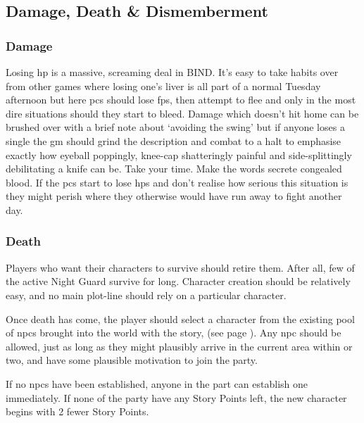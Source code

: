\begin{multicols}{2}

\subsection{Damage, Death \& Dismemberment}

\subsubsection{Damage}

Losing \gls{hp} is a massive, screaming deal in BIND.
It's easy to take habits over from other games where losing one's liver is all part of a normal Tuesday afternoon but here \glspl{pc} should lose \glspl{fp}, then attempt to flee and only in the most dire situations should they start to bleed.
Damage which doesn't hit home can be brushed over with a brief note about `avoiding the swing' but if anyone loses a single  the \gls{gm} should grind the description and combat to a halt to emphasise exactly how eyeball poppingly, knee-cap shatteringly painful and side-splittingly debilitating a knife can be.
Take your time.
Make the words secrete congealed blood.
If the \glspl{pc} start to lose \glspl{hp} and don't realise how serious this situation is they might perish where they otherwise would have run away to fight another day.

\subsubsection{Death}
\label{pcdeath}

Players who want their characters to survive should retire them.
After all, few of the active Night Guard survive for long.
Character creation should be relatively easy, and no main plot-line should rely on a particular character.

Once death has come, the player should select a character from the existing pool of \glspl{npc} brought into the world with the story,  (see page \pageref{oldnpc}).
Any \gls{npc} should be allowed, just as long as they might plausibly arrive in the current area within  or two, and have some plausible motivation to join the party.

If no \glspl{npc} have been established, anyone in the part can establish one immediately.
If none of the party have any Story Points left, the new character begins with 2 fewer Story Points.


\end{multicols}
